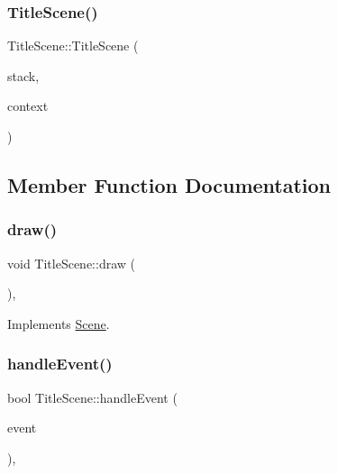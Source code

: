 \subsubsection{\texorpdfstring{Title\+Scene()}{TitleScene()}}
{\footnotesize\ttfamily Title\+Scene\+::\+Title\+Scene (\begin{DoxyParamCaption}\item[{\hyperlink{class_scene_stack}{Scene\+Stack} \&}]{stack,  }\item[{\hyperlink{struct_scene_1_1_context}{Context}}]{context }\end{DoxyParamCaption})}



\subsection{Member Function Documentation}
\hypertarget{class_title_scene_a3e527255771f75a41c4fe8aaa35999dd}{}\label{class_title_scene_a3e527255771f75a41c4fe8aaa35999dd} 
\subsubsection{\texorpdfstring{draw()}{draw()}}
{\footnotesize\ttfamily void Title\+Scene\+::draw (\begin{DoxyParamCaption}{ }\end{DoxyParamCaption})\hspace{0.3cm}{\ttfamily [override]}, {\ttfamily [virtual]}}



Implements \hyperlink{class_scene_a789c16961aa1e316b2a4a05b95187546}{Scene}.

\hypertarget{class_title_scene_a1f019a83309ce967883b4b4d76b816af}{}\label{class_title_scene_a1f019a83309ce967883b4b4d76b816af} 
\subsubsection{\texorpdfstring{handle\+Event()}{handleEvent()}}
{\footnotesize\ttfamily bool Title\+Scene\+::handle\+Event (\begin{DoxyParamCaption}\item[{const sf\+::\+Event \&}]{event }\end{DoxyParamCaption})\hspace{0.3cm}{\ttfamily [override]}, {\ttfamily [virtual]}}



